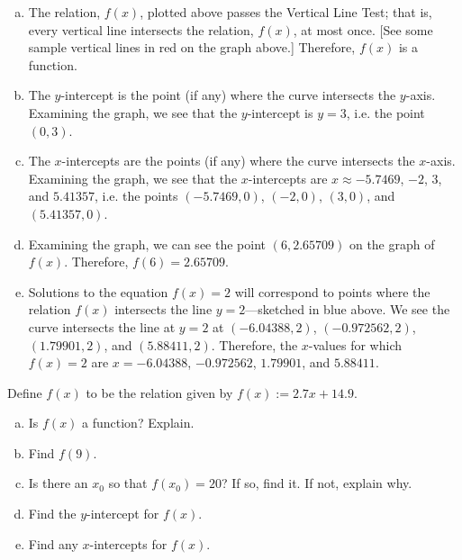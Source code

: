 \documentclass[11pt,letterpaper]{article}
\begin{document}
\sol 
\begin{enumerate}[(a)]
\item The relation, $f(x)$, plotted above passes the Vertical Line Test; that is, every vertical line intersects the relation, $f(x)$, at most once. [See some sample vertical lines in red on the graph above.] Therefore, $f(x)$ is a function. \pspace

\item The $y$-intercept is the point (if any) where the curve intersects the $y$-axis. Examining the graph, we see that the $y$-intercept is $y= 3$, i.e. the point $(0, 3)$. 

\item The $x$-intercepts are the points (if any) where the curve intersects the $x$-axis. Examining the graph, we see that the $x$-intercepts are $x \approx -5.7469$, $-2$, $3$, and $5.41357$, i.e. the points $(-5.7469, 0)$, $(-2, 0)$, $(3, 0)$, and $(5.41357, 0)$. \pspace

\item Examining the graph, we can see the point $(6, 2.65709)$ on the graph of $f(x)$. Therefore, $f(6)= 2.65709$. 

\item Solutions to the equation $f(x)= 2$ will correspond to points where the relation $f(x)$ intersects the line $y= 2$---sketched in blue above. We see the curve intersects the line at $y= 2$ at $(-6.04388, 2)$, $(-0.972562, 2)$, $(1.79901, 2)$, and $(5.88411, 2)$. Therefore, the $x$-values for which $f(x)= 2$ are $x= -6.04388$, $-0.972562$, $1.79901$, and $5.88411$. 
\end{enumerate}



\newpage



 Define $f(x)$ to be the relation given by $f(x):= 2.7x + 14.9$.
	\begin{enumerate}[(a)]
	\item Is $f(x)$ a function? Explain.
	\item Find $f(9)$.
	\item Is there an $x_0$ so that $f(x_0)= 20$? If so, find it. If not, explain why. 
	\item Find the $y$-intercept for $f(x)$. 
	\item Find any $x$-intercepts for $f(x)$.
	\end{enumerate} \pspace
\end{document}
